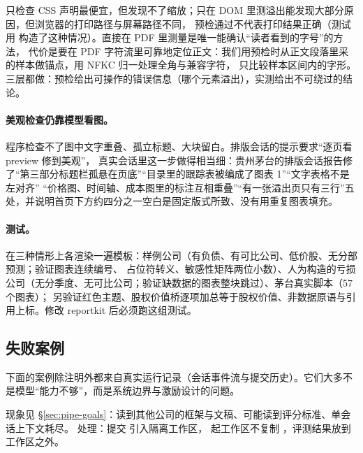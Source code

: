 \begin{tradeoff}
只检查 CSS 声明最便宜，但发现不了缩放；只在 DOM 里测溢出能发现大部分原因，但浏览器的打印路径与屏幕路径不同，
预检通过不代表打印结果正确（测试用  构造了这种情况）。直接在 PDF 里测量是唯一能确认“读者看到的字号”的方法，
代价是要在 PDF 字符流里可靠地定位正文：我们用预检时从正文段落里采的样本做锚点，用 NFKC 归一处理全角与兼容字符，
只比较样本区间内的字形。三层都做：预检给出可操作的错误信息（哪个元素溢出），实测给出不可绕过的结论。
\end{tradeoff}

\paragraph{美观检查仍靠模型看图。}程序检查不了图中文字重叠、孤立标题、大块留白。排版会话的提示要求“逐页看 preview 修到美观”，
真实会话里这一步做得相当细：贵州茅台的排版会话报告修了“第三部分标题栏孤悬在页底”“目录里的跟踪表被编成了图表 1”“文字表格不是左对齐”
“价格图、时间轴、成本图里的标注互相重叠”“有一张溢出页只有三行”五处，并说明首页下方约四分之一空白是固定版式所致、没有用重复图表填充。

\paragraph{测试。} 在三种情形上各渲染一遍模板：样例公司（有负债、有可比公司、低价股、无分部预测；验证图表连续编号、
占位符转义、敏感性矩阵两位小数）、人为构造的亏损公司（无分季度、无可比公司；验证缺数据的图表整块跳过）、茅台真实脚本（57 个图表）；
另验证红色主题、股权价值桥逐项加总等于股权价值、非数据原语与引用上标。修改 reportkit 后必须跑这组测试。

\subsection{失败案例}
\label{sec:pipe-failures}

下面的案例除注明外都来自真实运行记录（会话事件流与提交历史）。它们大多不是模型“能力不够”，而是系统边界与激励设计的问题。

\begin{failcase}[ 1：仓库内直接写研报]
现象见 \S\ref{sec:pipe-goals}：读到其他公司的框架与文稿、可能读到评分标准、单会话上下文耗尽。
处理：提交  引入隔离工作区， 起工作区不复制 ，评测结果放到工作区之外。
\end{failcase}

